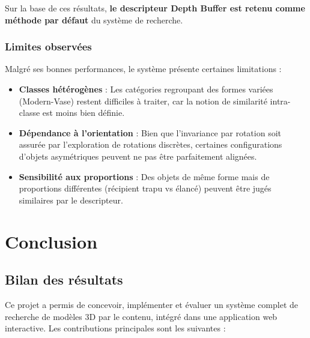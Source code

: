 \documentclass[11pt,a4paper,oneside]{report}
\begin{document}
Sur la base de ces résultats, \textbf{le descripteur Depth Buffer est retenu comme méthode par défaut} du système de recherche.

\subsection{Limites observées}

Malgré ses bonnes performances, le système présente certaines limitations :

\begin{itemize}
\item \textbf{Classes hétérogènes} : Les catégories regroupant des formes variées (Modern-Vase) restent difficiles à traiter, car la notion de similarité intra-classe est moins bien définie.

\item \textbf{Dépendance à l'orientation} : Bien que l'invariance par rotation soit assurée par l'exploration de rotations discrètes, certaines configurations d'objets asymétriques peuvent ne pas être parfaitement alignées.

\item \textbf{Sensibilité aux proportions} : Des objets de même forme mais de proportions différentes (récipient trapu vs élancé) peuvent être jugés similaires par le descripteur.
\end{itemize}


\chapter{Conclusion}

\section{Bilan des résultats}

Ce projet a permis de concevoir, implémenter et évaluer un système complet de recherche de modèles 3D par le contenu, intégré dans une application web interactive. Les contributions principales sont les suivantes :
\end{document}
